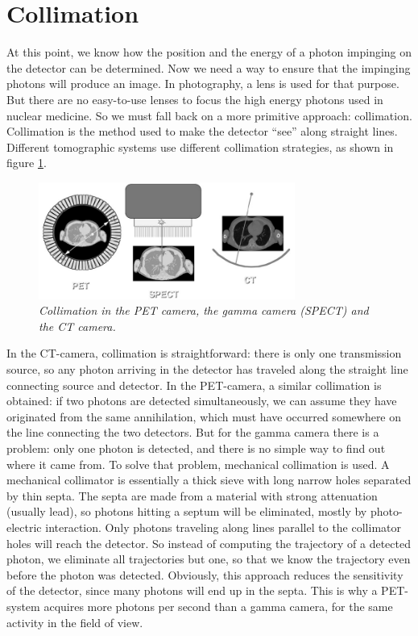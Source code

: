 \documentclass[11pt,oneside]{book}
\begin{document}
\section{Collimation}

At this point, we know how the position and the energy of a photon
impinging on the detector can be determined. Now we need a way to
ensure that the impinging photons will produce an image. In
photography, a lens is used for that purpose. But there are no
easy-to-use lenses to focus the high energy photons used in nuclear
medicine. So we must fall back on a more primitive approach:
collimation. Collimation is the method used to make the detector
``see'' along straight lines. Different tomographic systems use
different collimation strategies, as shown in figure
\ref{fig:spect_pet_ct}.

\begin{figure}[tb]
\centering
\includegraphics[width=0.75\textwidth]{figs/fig_spect_pet_ct.pdf}
\caption{\label{fig:spect_pet_ct} \emph{Collimation in the PET camera, the
gamma camera (SPECT) and the CT camera.}}
\end{figure}

In the CT-camera, collimation is straightforward: there is only one
transmission source, so any photon arriving in the detector has traveled along
the straight line connecting source and detector. In the PET-camera, a similar
collimation is obtained: if two photons are detected simultaneously, we can
assume they have originated from the same annihilation, which must have
occurred somewhere on the line connecting the two detectors. But for the gamma
camera there is a problem: only one photon is detected, and there is no simple
way to find out where it came from. To solve that problem, mechanical
collimation is used. A mechanical collimator is essentially a thick sieve with
long narrow holes separated by thin septa. The septa are made from a material
with strong attenuation (usually lead), so photons hitting a septum will be
eliminated, mostly by photo-electric interaction. Only photons traveling along
lines parallel to the collimator holes will reach the detector. So instead of
computing the trajectory of a detected photon, we eliminate all trajectories
but one, so that we know the trajectory even before the photon was detected.
Obviously, this approach reduces the sensitivity of the detector, since many
photons will end up in the septa. This is why a PET-system acquires more
photons per second than a gamma camera, for the same activity in the field of
view.
\end{document}
